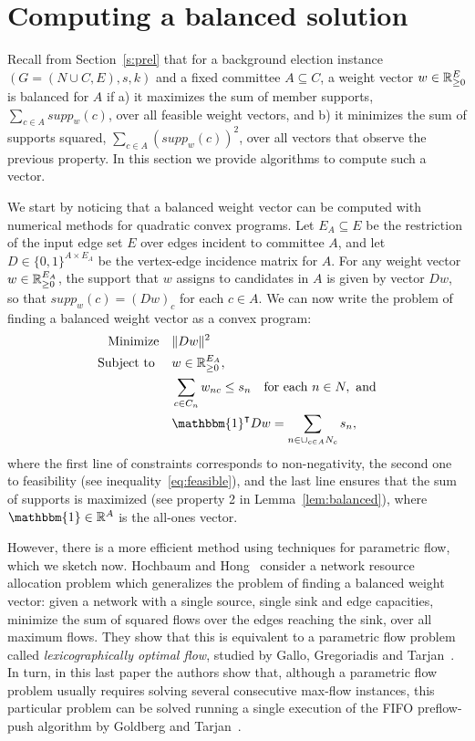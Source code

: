 \section{Computing a balanced solution} \label{s:balanced}

Recall from Section~\ref{s:prel} that for a background election instance $(G = (N \cup C, E), s, k)$ and a fixed committee $A\subseteq C$, a weight vector $w\in \mathbb{R}_{\geq 0}^E$ is balanced for $A$ if a) it maximizes the sum of member supports, $\sum_{c\in A} supp_w(c)$, over all feasible weight vectors, and b) it minimizes the sum of supports squared, $\sum_{c\in A} (supp_w(c))^2$, over all vectors that observe the previous property. 
In this section we provide algorithms to compute such a vector.

We start by noticing that a balanced weight vector can be computed with numerical methods for quadratic convex programs. 
Let $E_A\subseteq E$ be the restriction of the input edge set $E$ over edges incident to committee $A$, and let $D\in\{0,1\}^{A\times E_A}$ be the vertex-edge incidence matrix for $A$. 
For any weight vector $w\in\mathbb{R}_{\geq 0}^{E_A}$, the support that $w$ assigns to candidates in $A$ is given by vector $Dw$, so that $supp_w(c)=(Dw)_c$ for each $c\in A$. 
We can now write the problem of finding a balanced weight vector as a convex program:
\begin{align*}
    \text{Minimize} \quad & \|Dw\|^2 \\
    \text{Subject to } \quad & w\in\R^{E_A}, \\
    & \sum_{c\in C_n} w_{nc} \leq s_n \quad \text{for each } n\in N, \text{ and} \\
    & \mathbbm{1}^{\intercal} Dw = \sum_{n\in \cup_{c\in A} N_c} s_n,
\end{align*}
where the first line of constraints corresponds to non-negativity, the second one to feasibility (see inequality~\ref{eq:feasible}), and the last line ensures that the sum of supports is maximized (see property 2 in Lemma~\ref{lem:balanced}), where $\mathbbm{1}\in\mathbb{R}^A$ is the all-ones vector. 



However, there is a more efficient method using techniques for parametric flow, which we sketch now. Hochbaum and Hong~\cite[Section 6]{hochbaum1995strongly} consider a network resource allocation problem which generalizes the problem of finding a balanced weight vector: given a network with a single source, single sink and edge capacities, minimize the sum of squared flows over the edges reaching the sink, over all maximum flows. 
They show that this is equivalent to a parametric flow problem called \emph{lexicographically optimal flow}, studied by Gallo, Gregoriadis and Tarjan~\cite{gallo1989fast}. 
In turn, in this last paper the authors show that, although a parametric flow problem usually requires solving several consecutive max-flow instances, this particular problem can be solved running a single execution of the FIFO preflow-push algorithm by Goldberg and Tarjan~\cite{goldberg1988new}.

